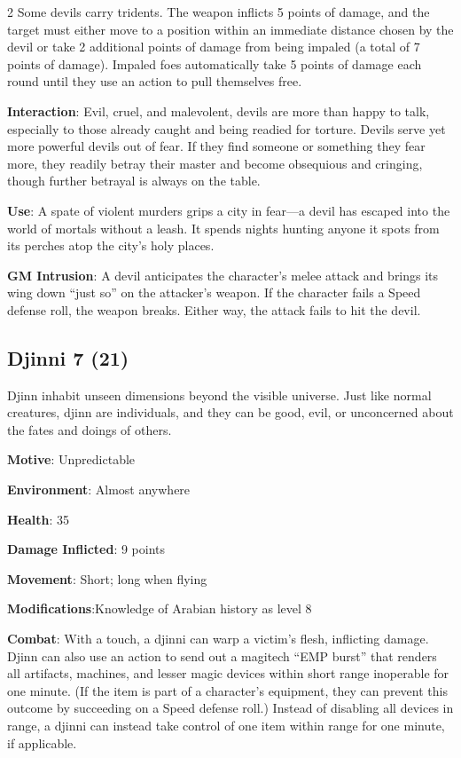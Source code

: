 \begin{multicols}{2}
Some devils carry tridents. The weapon inflicts 5 points of damage, and the target must either move to a position within an immediate distance chosen by the devil or take 2 additional points of damage from being impaled (a total of 7 points of damage). Impaled foes automatically take 5 points of damage each round until they use an action to pull themselves free.

\textbf{Interaction}: Evil, cruel, and malevolent, devils are more than happy to talk, especially to those already caught and being readied for torture. Devils serve yet more powerful devils out of fear. If they find someone or something they fear more, they readily betray their master and become obsequious and cringing, though further betrayal is always on the table.

\textbf{Use}: A spate of violent murders grips a city in fear—a devil has escaped into the world of mortals without a leash. It spends nights hunting anyone it spots from its perches atop the city’s holy places.

\textbf{GM Intrusion}: A devil anticipates the character’s melee attack and brings its wing down “just so” on the attacker’s weapon. If the character fails a Speed defense roll, the weapon breaks. Either way, the attack fails to hit the devil.

\subsection{Djinni	7 (21)}

Djinn inhabit unseen dimensions beyond the visible universe. Just like normal creatures, djinn are individuals, and they can be good, evil, or unconcerned about the fates and doings of others.

\textbf{Motive}: Unpredictable

\textbf{Environment}: Almost anywhere 

\textbf{Health}: 35

\textbf{Damage Inflicted}: 9 points

\textbf{Movement}: Short; long when flying

\textbf{Modifications}:Knowledge of Arabian history as level 8

\textbf{Combat}: With a touch, a djinni can warp a victim’s flesh, inflicting damage. Djinn can also use an action to send out a magitech “EMP burst” that renders all artifacts, machines, and lesser magic devices within short range inoperable for one minute. (If the item is part of a character’s equipment, they can prevent this outcome by succeeding on a Speed defense roll.) Instead of disabling all devices in range, a djinni can instead take control of one item within range for one minute, if applicable.


\end{multicols}
